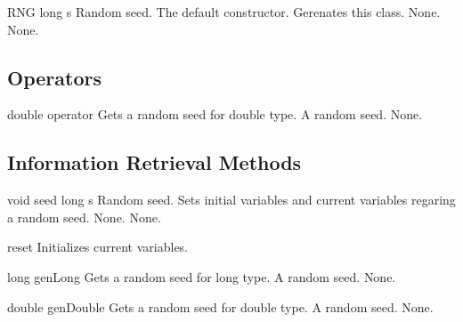 \setNormalInstance
\printMethodWithOneParam
{}
{RNG}
{long}
{s}
{Random seed.}
{The default constructor. Gerenates this class.}
{None.}
{None.}

\vspace*{10mm}

\subsection{Operators}

\setNormalInstance
\printEmptyMethodReturnSpecial
{double}
{operator}
{Gets a random seed for double type.}
{A random seed.}
{None.}

\clearpage

\subsection{Information Retrieval Methods}

\setNormalInstance
\printMethodWithOneParam
{void}
{seed}
{long}
{s}
{Random seed.}
{Sets initial variables and current variables regaring a random seed.}
{None.}
{None.}

\setNormalInstance
\printEmptyMethod
{reset}
{Initializes current variables.}

\setNormalInstance
\printEmptyMethodReturnSpecial
{long}
{genLong}
{Gets a random seed for long type.}
{A random seed.}
{None.}

\setNormalInstance
\printEmptyMethodReturnSpecial
{double}
{genDouble}
{Gets a random seed for double type.}
{A random seed.}
{None.}

